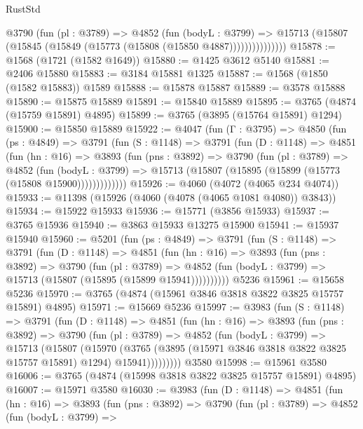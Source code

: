 \begin{lexlean}{RustStd}
\begin{coremodule}
                @3790
                  (fun (pl : @3789) =>
                  @4852
                    (fun (bodyL : @3799) =>
                    @15713 (@15807 (@15845 (@15849 (@15773 (@15808 (@15850 @4887)))))))))))))))
@15878 := @1568 (@1721 (@1582 @1649))
@15880 := @1425 @3612 @5140
@15881 := @2406 @15880
@15883 := @3184 @15881 @1325
@15887 := @1568 (@1850 (@1582 @15883)) @1589
@15888 := @15878 @15887
@15889 := @3578 @15888
@15890 := @15875 @15889
@15891 := @15840 @15889
@15895 := @3765 (@4874 (@15759 @15891) @4895)
@15899 := @3765 (@3895 (@15764 @15891) @1294)
@15900 := @15850 @15889
@15922 := @4047
    (fun (Γ : @3795) =>
    @4850
      (fun (ps : @4849) =>
      @3791
        (fun (S : @1148) =>
        @3791
          (fun (D : @1148) =>
          @4851
            (fun (hn : @16) =>
            @3893
              (fun (pns : @3892) =>
              @3790
                (fun (pl : @3789) =>
                @4852
                  (fun (bodyL : @3799) =>
                  @15713 (@15807 (@15895 (@15899 (@15773 (@15808 @15900)))))))))))))
@15926 := @4060 (@4072 (@4065 @234 @4074))
@15933 := @11398 (@15926 (@4060 (@4078 (@4065 @1081 @4080)) @3843))
@15934 := @15922 @15933
@15936 := @15771 (@3856 @15933)
@15937 := @3765 @15936
@15940 := @3863 @15933 @13275 @15900
@15941 := @15937 @15940
@15960 := @5201
    (fun (ps : @4849) =>
    @3791
      (fun (S : @1148) =>
      @3791
        (fun (D : @1148) =>
        @4851
          (fun (hn : @16) =>
          @3893
            (fun (pns : @3892) =>
            @3790
              (fun (pl : @3789) =>
              @4852 (fun (bodyL : @3799) => @15713 (@15807 (@15895 (@15899 @15941))))))))))
    @5236
@15961 := @15658 @5236
@15970 := @3765 (@4874 (@15961 @3846 @3818 @3822 @3825 @15757 @15891) @4895)
@15971 := @15669 @5236
@15997 := @3983
    (fun (S : @1148) =>
    @3791
      (fun (D : @1148) =>
      @4851
        (fun (hn : @16) =>
        @3893
          (fun (pns : @3892) =>
          @3790
            (fun (pl : @3789) =>
            @4852
              (fun (bodyL : @3799) =>
              @15713
                (@15807
                  (@15970
                    (@3765
                      (@3895 (@15971 @3846 @3818 @3822 @3825 @15757 @15891) @1294)
                      @15941)))))))))
    @3580
@15998 := @15961 @3580
@16006 := @3765 (@4874 (@15998 @3818 @3822 @3825 @15757 @15891) @4895)
@16007 := @15971 @3580
@16030 := @3983
    (fun (D : @1148) =>
    @4851
      (fun (hn : @16) =>
      @3893
        (fun (pns : @3892) =>
        @3790
          (fun (pl : @3789) =>
          @4852
            (fun (bodyL : @3799) =>

\end{coremodule}
\end{lexlean}
